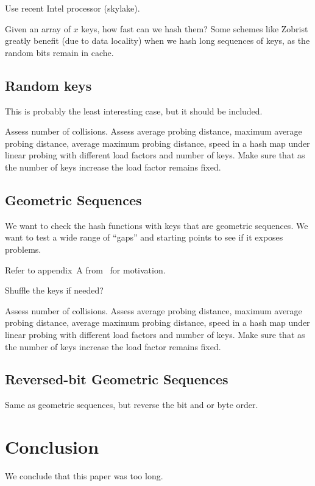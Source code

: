 \documentclass{article}
\begin{document}
Use recent Intel processor (skylake).

Given an array of $x$ keys, how fast can we hash them? Some schemes like Zobrist greatly benefit (due to data locality) when we hash long sequences of keys, as the random bits remain in cache.



\subsection{Random keys}

This is probably the least interesting case, but it should be included.

Assess number of collisions.
Assess average probing distance, 
maximum average probing distance, 
average maximum probing distance, 
speed in a hash map under linear probing with different load factors and number of keys. Make sure that as the number of keys increase the load factor remains fixed.

\subsection{Geometric Sequences}

We want to check the hash functions with keys that are geometric sequences. We want to test a wide range of ``gaps'' and starting points to see if it exposes problems. 

Refer to appendix~A from~\cite{Patrascu:2012:PST:2220357.2220361} for motivation.

Shuffle the keys if needed?

Assess number of collisions.
Assess average probing distance, 
maximum average probing distance, 
average maximum probing distance, 
speed in a hash map under linear probing with different load factors and number of keys.  Make sure that as the number of keys increase the load factor remains fixed.

\subsection{Reversed-bit Geometric Sequences}

Same as geometric sequences, but reverse the bit and or byte order.

\section{Conclusion}

We conclude that this paper was too long.


 
\end{document}
